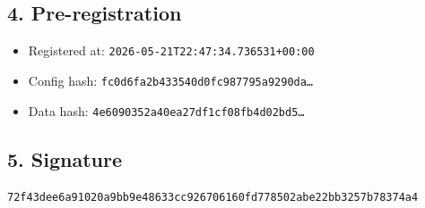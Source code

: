 \documentclass{article}
\begin{document}
\subsection*{4. Pre-registration}
\begin{itemize}
\item Registered at: \texttt{2026-05-21T22:47:34.736531+00:00}
\item Config hash: \texttt{fc0d6fa2b433540d0fc987795a9290da\dots}
\item Data hash: \texttt{4e6090352a40ea27df1cf08fb4d02bd5\dots}
\end{itemize}
\subsection*{5. Signature}
\texttt{72f43dee6a91020a9bb9e48633cc926706160fd778502abe22bb3257b78374a4}\\
\end{document}
